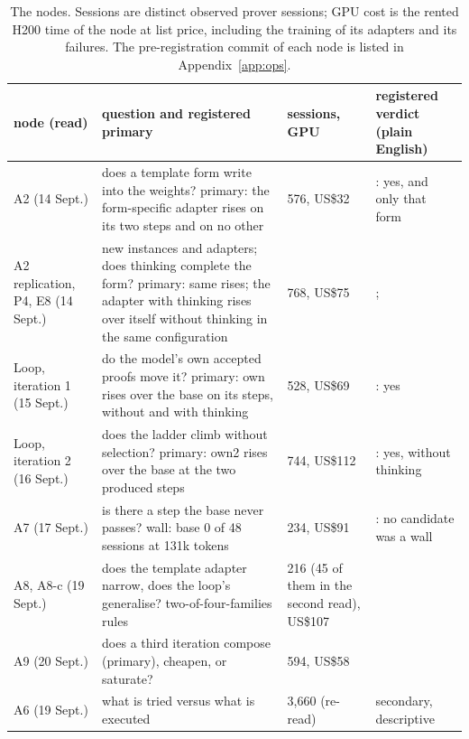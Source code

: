 \documentclass[11pt]{article}
\begin{document}
\begin{table}[!htbp]
\centering\footnotesize
\setlength{\tabcolsep}{4pt}
\begin{tabular}{R{2.4cm} R{6.0cm} R{2.1cm} R{4.2cm}}
\toprule
node (read) & question and registered primary & sessions, GPU & registered verdict (plain English) \\
\midrule
A2 (14 Sept.) & does a template form write into the weights? primary: the form-specific adapter rises on its two steps and on no other & 576, US\$32 & : yes, and only that form \\
A2 replication, P4, E8 (14 Sept.) & new instances and adapters; does thinking complete the form? primary: same rises; the adapter with thinking rises over itself without thinking in the same configuration & 768, US\$75 & ;  \\
Loop, iteration 1 (15 Sept.) & do the model's own accepted proofs move it? primary: own rises over the base on its steps, without and with thinking & 528, US\$69 & : yes \\
Loop, iteration 2 (16 Sept.) & does the ladder climb without selection? primary: own2 rises over the base at the two produced steps & 744, US\$112 & : yes, without thinking \\
A7 (17 Sept.) & is there a step the base never passes? wall: base 0 of 48 sessions at 131k tokens & 234, US\$91 & : no candidate was a wall \\
A8, A8-c (19 Sept.) & does the template adapter narrow, does the loop's generalise? two-of-four-families rules & 216 (45 of them in the second read), US\$107 &  \\
A9 (20 Sept.) & does a third iteration compose (primary), cheapen, or saturate? & 594, US\$58 &  \\
A6 (19 Sept.) & what is tried versus what is executed & 3,660 (re-read) & secondary, descriptive \\
\bottomrule
\end{tabular}
\caption{The nodes. Sessions are distinct observed prover sessions; GPU cost is the rented H200 time of the node at list price, including the training of its adapters and its failures. The pre-registration commit of each node is listed in Appendix~\ref{app:ops}.}
\label{tab:nodes}
\end{table}
\end{document}
